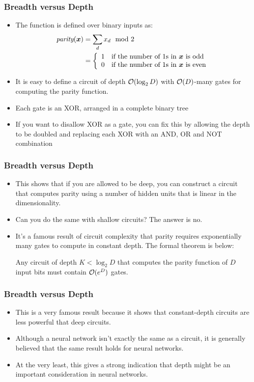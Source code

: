 \documentclass[trans]{beamer}
\begin{document}
\begin{frame}
  \frametitle{Breadth versus Depth}
\begin{itemize}
\item
  The function is defined over binary inputs as:
%
\begin{align}
\textit{parity}({\boldsymbol{x}})
&= \sum_d x_d \mod 2 \\
&= \left\{\begin{array}{ll} 1 & \text{if the number of $1$s in ${\boldsymbol{x}}$ is odd} \\
           0 & \text{if the number of $1$s in ${\boldsymbol{x}}$ is even} \end{array}\right.
\end{align}
%
%
\item It is easy to define a circuit of depth $\mathcal{O}(\log_2 D)$ with
$\mathcal{O}(D)$-many gates for computing the parity function.
\item  Each gate is
an XOR, arranged in a complete binary tree
\item If you want to disallow XOR as a
gate, you can fix this by allowing the depth to be doubled and
replacing each XOR with an AND, OR and NOT combination
\end{itemize}
\end{frame}

\begin{frame}
  \frametitle{Breadth versus Depth}
\begin{itemize}
\item
This shows that if you are allowed to be deep, you can construct a
circuit  that computes parity using a number of hidden units that
is linear in the dimensionality.
\item   Can you do the same with shallow
circuits?  The answer is no. 
\item  It's a famous result of circuit
complexity that parity requires exponentially many gates to compute in
constant depth.  The formal theorem is below:
\begin{theorem} \label{thm:nnet:parity}
  Any circuit of depth $K < \log_2 D$ that computes the parity
  function of $D$ input bits must contain $\mathcal{O}(e^D)$ gates.
\end{theorem}
\end{itemize}
\end{frame}

\begin{frame}
  \frametitle{Breadth versus Depth}
\begin{itemize}
\item
This is a very famous result because it shows that constant-depth
circuits are less powerful that deep circuits.  
\item Although a neural
network isn't exactly the same as a circuit, it is generally believed
that the same result holds for neural networks.
\item  At the very least,
this gives a strong indication that depth might be an important
consideration in neural networks.
\end{itemize}
\end{frame}
\end{document}
